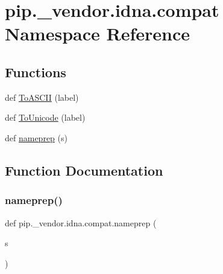 \hypertarget{namespacepip_1_1__vendor_1_1idna_1_1compat}{}\section{pip.\+\_\+vendor.\+idna.\+compat Namespace Reference}
\label{namespacepip_1_1__vendor_1_1idna_1_1compat}
\subsection*{Functions}
\begin{DoxyCompactItemize}
\item 
def \hyperlink{namespacepip_1_1__vendor_1_1idna_1_1compat_add4f36a7d584c6fd782e7ea5e450ed59}{To\+A\+S\+C\+II} (label)
\item 
def \hyperlink{namespacepip_1_1__vendor_1_1idna_1_1compat_a38f5a4547daa72377903b73d2877b642}{To\+Unicode} (label)
\item 
def \hyperlink{namespacepip_1_1__vendor_1_1idna_1_1compat_a1a71cb40472c9e01fc1af9f62521f1e1}{nameprep} (s)
\end{DoxyCompactItemize}


\subsection{Function Documentation}
\mbox{\label{namespacepip_1_1__vendor_1_1idna_1_1compat_a1a71cb40472c9e01fc1af9f62521f1e1}} 
\subsubsection{\texorpdfstring{nameprep()}{nameprep()}}
{\footnotesize\ttfamily def pip.\+\_\+vendor.\+idna.\+compat.\+nameprep (\begin{DoxyParamCaption}\item[{}]{s }\end{DoxyParamCaption})}

\mbox{\label{namespacepip_1_1__vendor_1_1idna_1_1compat_add4f36a7d584c6fd782e7ea5e450ed59}} 
